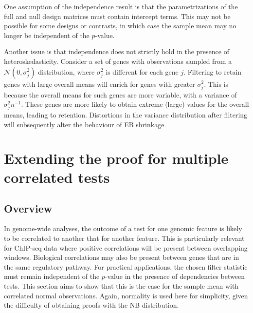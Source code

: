 \documentclass{article}
\newcommand{\nsamples}{n}
\newcommand{\gene}{j}
\newcommand{\normal}{\mathcal{N}}
\newcommand{\normvar}{\sigma^2}
\begin{document}
One assumption of the independence result is that the parametrizations of the full and null design matrices must contain intercept terms.  
This may not be possible for some designs or contrasts, in which case the sample mean may no longer be independent of the $p$-value.  

Another issue is that independence does not strictly hold in the presence of heteroskedasticity.
Consider a set of genes with observations sampled from a $\normal(0, \normvar_\gene)$ distribution, where $\normvar_\gene$ is different for each gene $\gene$.
Filtering to retain genes with large overall means will enrich for genes with greater $\normvar_\gene$.
This is because the overall means for such genes are more variable, with a variance of $\normvar_\gene \nsamples^{-1}$.
These genes are more likely to obtain extreme (large) values for the overall means, leading to retention.
Distortions in the variance distribution after filtering will subsequently alter the behaviour of EB shrinkage.


\section{Extending the proof for multiple correlated tests}

\subsection{Overview}
In genome-wide analyses, the outcome of a test for one genomic feature is likely to be correlated to another that for another feature.
This is particularly relevant for ChIP-seq data where positive correlations will be present between overlapping windows.
Biological correlations may also be present between genes that are in the same regulatory pathway.
For practical applications, the chosen filter statistic must remain independent of the $p$-value in the presence of dependencies between tests.
This section aims to show that this is the case for the sample mean with correlated normal observations.
Again, normality is used here for simplicity, given the difficulty of obtaining proofs with the NB distribution.
\end{document}
